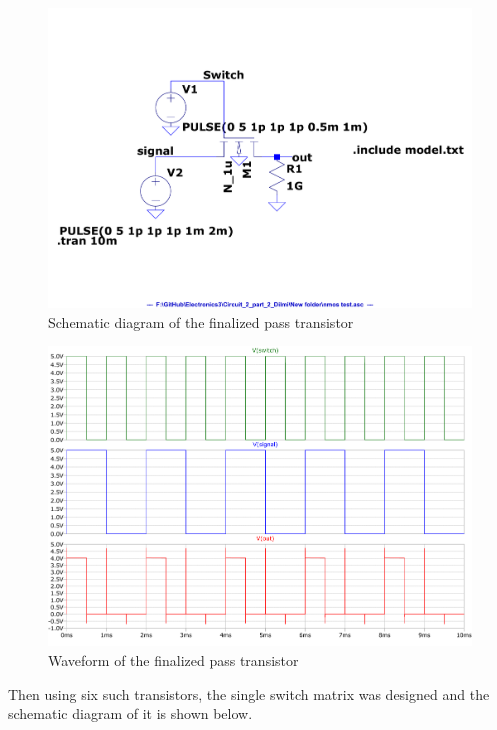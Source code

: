 \documentclass[a4paper,11pt]{article}%
\begin{document}
\begin{figure}[H]
	\centering
	\includegraphics[scale=0.5]{figures/2part2/pass_ttr.pdf}
	\caption{Schematic diagram of the finalized pass transistor}
\end{figure}
\begin{figure}[H]
	\centering
	\includegraphics[scale=0.5]{figures/2part2/pass_wave.pdf}
	\caption{Waveform of the finalized pass transistor}
\end{figure}

Then using six such transistors, the single switch matrix was designed and the schematic diagram of it is shown below.
\end{document}
